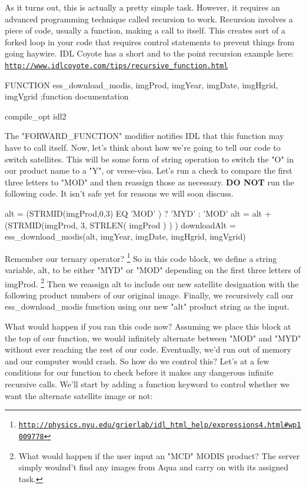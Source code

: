 \documentclass{book}
\newcommand{\codefill}{\centering$\longrightarrow$\hfill{\color{gray}\rule[0.1\baselineskip]{0.5\linewidth}{2pt}}\hfill$\longleftarrow$}
\newcounter{highlight}[page]
\newcommand{\tikzhighlightanchor}[1]{\ensuremath{\vcenter{\hbox{\tikz[remember picture, overlay]{\coordinate (#1 highlight \arabic{highlight});}}}}}
\newcommand{\bh}[0]{\stepcounter{highlight}\tikzhighlightanchor{begin}}
\newcommand{\eh}[0]{\tikzhighlightanchor{end}}
\theoremstyle{aside_style}
\newcommand{\link}[1]{\href{#1}{\nolinkurl{#1}}} %
\begin{document}
As it turns out, this is actually a pretty simple task.
However, it requires an advanced programming technique called recursion to work.
Recursion involves a piece of code, usually a function, making a call to itself.
This creates sort of a forked loop in your code that requires control statements to prevent things from going haywire.
IDL Coyote has a short and to the point recursion example here: \link{http://www.idlcoyote.com/tips/recursive_function.html}

\begin{idl}
FUNCTION ess_download_modis, imgProd, imgYear, imgDate, imgHgrid, imgVgrid
;function documentation


compile_opt idl2
\end{idl}

The "FORWARD\_FUNCTION" modifier notifies IDL that this function may have to call itself.
Now, let's think about how we're going to tell our code to switch satellites.
This will be some form of string operation to switch the "O" in our product name to a "Y", or verse-visa.
Let's run a check to compare the first three letters to "MOD" and then reassign those as necessary.
\textbf{DO NOT} run the following code. It isn't safe yet for reasons we will soon discuss.

\begin{idl}

alt = (STRMID(imgProd,0,3) EQ 'MOD' ) ? 'MYD' : 'MOD'
alt = alt + (STRMID(imgProd, 3, STRLEN( imgProd ) ) )
downloadAlt = ess_download_modis(alt, imgYear, imgDate, imgHgrid, imgVgrid)
\end{idl}

Remember our ternary operator? \footnote{\link{http://physics.nyu.edu/grierlab/idl_html_help/expressions4.html\#wp1009778} }
So in this code block, we define a string variable, alt, to be either "MYD" or "MOD" depending on the first three letters of imgProd.
\footnote{What would happen if the user input an "MCD" MODIS product? The server simply woulnd't find any images from Aqua and carry on with its assigned task.}
Then we reassign alt to include our new satellite designation with the following product numbers of our original image.
Finally, we recursively call our ess\_download\_modis function using our new "alt" product string as the input.

What would happen if you ran this code now? 
Assuming we place this block at the top of our function, we would infinitely alternate between "MOD" and "MYD" without ever reaching the rest of our code.
Eventually, we'd run out of memory and our computer would crash. So how do we control this?
Let's at a few conditions for our function to check before it makes any dangerous infinite recursive calls.
We'll start by adding a function keyword to control whether we want the alternate satellite image or not:
\end{document}
